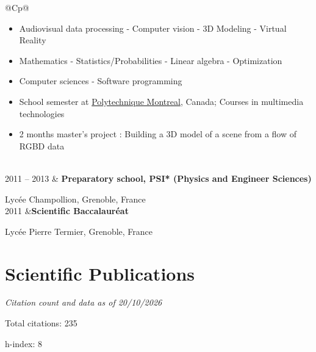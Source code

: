 \documentclass[11pt,a4paper]{article}
\newlength{\colone}
\newlength{\coltwo}
\newcommand{\notes}[1]{{\small\color{gray}\itshape #1}}
\newcommand{\me}{{\bfseries M. Jacquet}}
\begin{document}
\begin{longtable}{@{}C{\colone}p{\coltwo}@{}}
{\begin{itemize}
				\item Audiovisual data processing - Computer vision - 3D Modeling - Virtual Reality
				\item Mathematics - Statistics/Probabilities - Linear algebra - Optimization
				\item Computer sciences - Software programming
				\item School semester at \href{http://www.polymtl.ca/}{Polytechnique Montreal}, Canada; Courses in multimedia technologies \par
			    \item 2 months master's project : Building a 3D model of a scene from a flow of RGBD data
			\end{itemize}
		}
\\
	2011 -- 2013
		& {\bfseries Preparatory school, PSI* (Physics and Engineer Sciences)}\par
    	{\small Lycée Champollion, Grenoble, France}
\\
	2011
		&{\bfseries Scientific Baccalauréat}\par
		{\small Lycée Pierre Termier, Grenoble, France}
\end{longtable}


\section{Scientific Publications}
\notes{Citation count and data as of 20/10/2026 \par
	Total citations: 235 \par
	h-index: 8 \par
}
\end{document}
